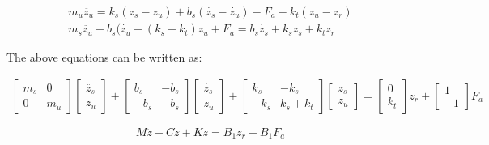 \documentclass[12pt, a4paper, oneside]{report}
\begin{document}
\begin{equation}
    \begin{aligned}
        m_u \ddot{z_u} = k_s (z_s - z_u) + b_s (\dot{z_s} - \dot{z_u}) - F_a - k_t (z_u - z_r) \\
        m_s \ddot{z_u} + b_s (\dot{z_u} + (k_s + k_t) z_u + F_a = b_s \dot{z_s} + k_s z_s + k_t z_r
    \end{aligned}
\end{equation}

The above equations can be written as:

\begin{equation}
    \begin{aligned}
        \begin{bmatrix}
            m_s & 0 \\
            0 & m_u
        \end{bmatrix}
        \begin{bmatrix}
            \ddot{z_s} \\
            \ddot{z_u}
        \end{bmatrix}
        +
        \begin{bmatrix}
            b_s & -b_s \\
            -b_s & -b_s
        \end{bmatrix}
        \begin{bmatrix}
            \dot{z_s} \\
            \dot{z_u}
        \end{bmatrix}
        +
        \begin{bmatrix}
            k_s & -k_s \\
            -k_s & k_s + k_t
        \end{bmatrix}
        \begin{bmatrix}
            z_s \\
            z_u
        \end{bmatrix}
        =
        \begin{bmatrix}
            0 \\
            k_t
        \end{bmatrix} z_r
        +
        \begin{bmatrix}
            1 \\
            -1
        \end{bmatrix} F_a
    \end{aligned}
\end{equation}

\begin{equation}
    M \ddot{z} + C \dot{z} + K z = B_1 z_r + B_1 F_a
\end{equation}
\end{document}
